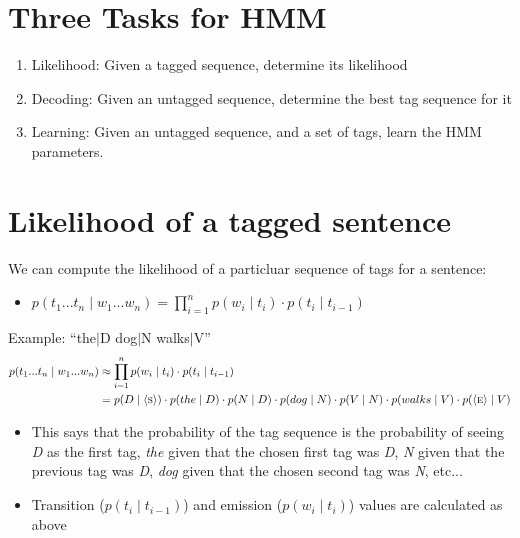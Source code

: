 \documentclass[11pt,letterpaper]{article}
\newcommand{\ngramstart}{\ensuremath{\langle \textsc{s} \rangle}}
\newcommand{\ngramend}{\ensuremath{\langle \textsc{e} \rangle}}
\begin{document}
\section{Three Tasks for HMM}

\begin{enumerate}
  \item Likelihood: Given a tagged sequence, determine its likelihood
  \item Decoding: Given an untagged sequence, determine the best tag sequence for it
  \item Learning: Given an untagged sequence, and a set of tags, learn the HMM parameters.
\end{enumerate}



\section{Likelihood of a tagged sentence}

We can compute the likelihood of a particluar sequence of tags for a sentence:

\begin{itemize}
  \item $p(t_1 ... t_n \mid w_1 ... w_n) = \prod_{i=1}^n p(w_i \mid t_i) \cdot p(t_i \mid t_{i-1})$
\end{itemize}


Example: ``the$|$D dog$|$N walks$|$V''
\begin{align*}
  p(t_1 ... t_n \mid w_1 ... w_n) 
    &\approx \prod_{i=1}^n p(w_i \mid t_i) \cdot p(t_i \mid t_{i-1}) \\
    &= p(D \mid \ngramstart) \cdot p(the   \mid D) \cdot
       p(N \mid D)           \cdot p(dog   \mid N) \cdot
       p(V \mid N)           \cdot p(walks \mid V) \cdot
       p(\ngramend \mid V)
\end{align*}

\begin{itemize}
  \item This says that the probability of the tag sequence is the probability of seeing \textit{D} as the first tag, \textit{the} given that the chosen first tag was \textit{D}, \textit{N} given that the previous tag was \textit{D}, \textit{dog} given that the chosen second tag was \textit{N}, etc...
  \item Transition ($p(t_i \mid t_{i-1})$) and emission ($p(w_i \mid t_i)$) values are calculated as above  
\end{itemize}
\end{document}
